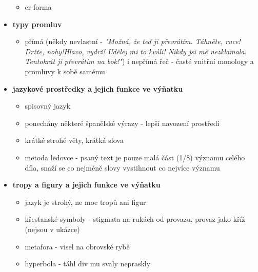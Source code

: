\documentclass[11pt]{article}
\begin{document}
\begin{itemize}
\begin{itemize}
            \item er-forma
        \end{itemize}
        \item\textbf{typy promluv}
        \begin{itemize}
            \item přímá (někdy nevlastní - \textit{"Možná, že teď ji převrátím. Táhněte, ruce! Držte, nohy!Hlavo, vydrž! Udělej mi to kvůli! Nikdy jsi mě nezklamala. Tentokrát ji převrátím na bok!"}) i nepřímá řeč - časté vnitřní monology a promluvy k sobě samému
        \end{itemize}
        \item\textbf{jazykové prostředky a jejich funkce ve výňatku}
        \begin{itemize}
            \item spisovný jazyk
            \item ponechány některé španělské výrazy - lepší navození prostředí
            \item krátké strohé věty, krátká slova
            \item metoda ledovce - psaný text je pouze malá část (1/8) významu celého díla, snaží se co nejméně slovy vystihnout co nejvíce významu
        \end{itemize}
        \item\textbf{tropy a figury a jejich funkce ve výňatku}
        \begin{itemize}
            \item jazyk je strohý, ne moc tropů ani figur
            \item křesťanské symboly - stigmata na rukách od provazu, provaz jako kříž (nejsou v ukázce)
            \item metafora - visel na obrovské rybě
            \item hyperbola - táhl div mu svaly nepraskly
        \end{itemize}
    \end{itemize}
\end{document}
